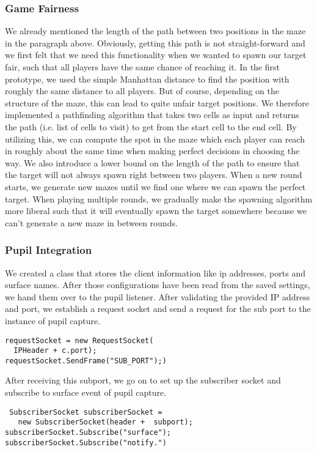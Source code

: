\documentclass{sigchi}
\begin{document}
\subsubsection{Game Fairness}
We already mentioned the length of the path between two positions in the maze in the paragraph above. Obviously, getting this path is not straight-forward and we first felt that we need this functionality when we wanted to spawn our target fair, such that all players have the same chance of reaching it. In the first prototype, we used the simple Manhattan distance to find the position with roughly the same distance to all players. But of course, depending on the structure of the maze, this can lead to quite unfair target positions. We therefore implemented a pathfinding algorithm that takes two cells as input and returns the path (i.e. list of cells to visit) to get from the start cell to the end cell. By utilizing this, we can compute the spot in the maze which each player can reach in roughly about the same time when making perfect decisions in choosing the way. We also introduce a lower bound on the length of the path to ensure that the target will not always spawn right between two players. When a new round starts, we generate new mazes until we find one where we can spawn the perfect target. When playing multiple rounds, we gradually make the spawning algorithm more liberal such that it will eventually spawn the target somewhere because we can't generate a new maze in between rounds.

\subsubsection{Pupil Integration}
We created a class that stores the client information like ip addresses, ports and surface names. After those configurations have been read from the saved settings, we hand them over to the pupil listener. After validating the provided IP address and port, we establish  a request socket and send a request for the sub port to the instance of pupil capture. 
\begin{verbatim}
requestSocket = new RequestSocket(
  IPHeader + c.port); 
requestSocket.SendFrame("SUB_PORT");)
\end{verbatim}


 After receiving this subport, we go on to set up the subscriber socket and subscribe to surface event of pupil capture. 
  \begin{verbatim}
 SubscriberSocket subscriberSocket = 
   new SubscriberSocket(header +  subport); 
subscriberSocket.Subscribe("surface");
subscriberSocket.Subscribe("notify.")
\end{verbatim}
 
\end{document}
